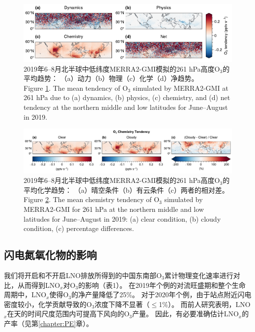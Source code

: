 \begin{figure}[!htbp]
    \centering
    \includegraphics[width=15cm]{./figures/uto3_tendency.pdf}
    \caption{
    2019年6--8月北半球中低纬度MERRA2-GMI模拟的261 hPa高度O$_3$的平均趋势：
    （a）动力（b）物理（c）化学（d）净趋势。\\
    Figure \ref{fig:uto3_tendency}. The mean tendency of O$_3$ simulated by MERRA2-GMI at 261 hPa due to (a) dynamics, (b) physics, (c) chemistry, and (d) net tendency at the northern middle and low latitudes for June--August in 2019.
    }
    \label{fig:uto3_tendency}
\end{figure}


\begin{figure}[!htbp]
    \centering
    \includegraphics[width=15cm]{./figures/uto3_chem_tendency.pdf}
    \caption{
    2019年6--8月北半球中低纬度MERRA2-GMI模拟的261 hPa高度O$_3$的平均化学趋势：
    （a）晴空条件（b）有云条件（c）两者的相对差。\\
    Figure \ref{fig:uto3_chem_tendency}. The mean chemistry tendency of O$_3$ simulated by MERRA2-GMI for 261 hPa at the northern middle and low latitudes for June--August in 2019:
    (a) clear condition, (b) cloudy condition, (c) percentage differences.
    }
    \label{fig:uto3_chem_tendency}
\end{figure}


\subsection{闪电氮氧化物的影响} \label{sec:lnox_effects}

我们将开启和不开启LNO排放所得到的中国东南部O$_3$累计物理变化速率进行对比，从而得到LNO$_x$对O$_3$的影响（表1）。
在2019年个例的对流旺盛期和整个生命周期中，LNO$_x$使得O$_3$的净产量降低了25\%。
对于2020年个例，由于站点附近闪电密度较小，化学贡献导致的O$_3$浓度下降不显著（$\leq$1\%）。
而前人研究表明，LNO$_x$在天的时间尺度范围内可提高下风向的O$_3$产量\citep{Pickering.1996,DeCaria.2005}。
因此，有必要准确估计LNO$_x$的产率（见第\ref{chapter:PE}章）。

